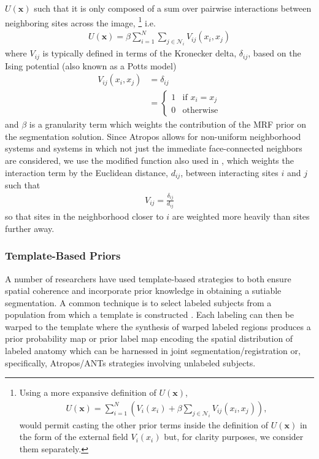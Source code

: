 \documentclass[11pt,english]{article}
\begin{document}
$U(\mathbf{x})$ such that it is only composed of a sum over pairwise
interactions between neighboring sites across the image,%
\footnote{
Using a more expansive definition of  $U(\mathbf{x})$, 
\begin{align}
U(\mathbf{x}) = \sum_{i = 1}^N \left( V_i(x_i) + \beta \sum_{j \in \mathcal{N}_i} V_{ij}( x_i, x_j ) \right), 
\end{align}
would permit casting the other prior terms inside the definition of $U(\mathbf{x})$ in the form of the external field $V_i(x_i)$ but, for clarity purposes, we consider them separately. 
}
i.e.
\begin{align}\label{eq:U}
U(\mathbf{x}) = \beta \sum_{i = 1}^N \sum_{j \in \mathcal{N}_i} V_{ij}( x_i, x_j )
\end{align}
where $V_{ij}$ is typically defined in terms of the Kronecker delta,
$\delta_{ij}$, based on the Ising potential (also known as a Potts model) \citep{Besag1974}
\begin{align}
V_{ij}(x_i, x_j) &= \delta_{ij} \nonumber \\
                          &= \left\{
                          \begin{array}{ll}
                            1 & \text{if } x_i = x_j \\
                            0 & \text{otherwise}
                          \end{array}
                         \right.   
\end{align}
and $\beta$ is a granularity term which weights the contribution of the MRF prior on the segmentation solution.
Since Atropos allows for non-uniform neighborhood systems and systems in which not just the immediate face-connected neighbors are considered, we use the modified function also used in \cite{Noe2001}, which weights the interaction term by the Euclidean distance, $d_{ij}$,  between interacting sites $i$ and $j$ such that 
\begin{align}
  V_{ij} = \frac{\delta_{ij}}{d_{ij}}
\end{align}
so that sites in the neighborhood closer to $i$ are weighted more heavily than sites further away.

\subsubsection{Template-Based Priors}
A number of researchers have used template-based strategies to both ensure spatial coherence and incorporate prior knowledge in obtaining a sutiable segmentation.  A common technique is to select labeled subjects from a population from which a template is constructed \citep[e.g.][which is also available in the ANTs toolkit]{Avants2010}.  Each labeling can then be warped to the template where the synthesis of warped labeled regions produces a prior probability map or prior label map encoding the spatial distribution of labeled anatomy which can be harnessed in joint segmentation/registration or, specifically, Atropos/ANTs strategies involving unlabeled subjects.
\end{document}
